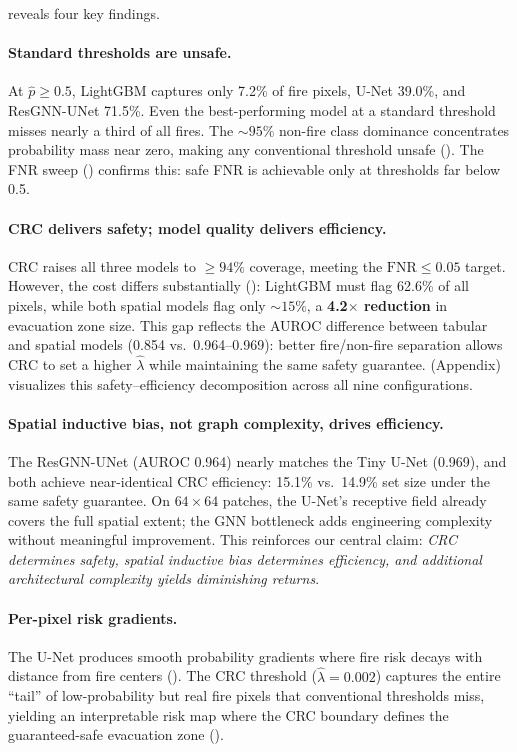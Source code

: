 \documentclass{article}
\begin{document}
 reveals four key findings.

\paragraph{Standard thresholds are unsafe.}
At $\hat{p} \ge 0.5$, LightGBM captures only 7.2\% of fire pixels, U-Net 39.0\%, and ResGNN-UNet 71.5\%.
Even the best-performing model at a standard threshold misses nearly a third of all fires.
The ${\sim}95\%$ non-fire class dominance concentrates probability mass near zero, making any conventional threshold unsafe ().
The FNR sweep () confirms this: safe FNR is achievable only at thresholds far below 0.5.

\paragraph{CRC delivers safety; model quality delivers efficiency.}
CRC raises all three models to ${\ge}94\%$ coverage, meeting the $\mathrm{FNR} \le 0.05$ target.
However, the cost differs substantially ():
LightGBM must flag 62.6\% of all pixels, while both spatial models flag only ${\sim}15\%$, a \textbf{4.2$\times$ reduction} in evacuation zone size.
This gap reflects the AUROC difference between tabular and spatial models (0.854 vs.\ 0.964--0.969): better fire/non-fire separation allows CRC to set a higher $\hat{\lambda}$ while maintaining the same safety guarantee.
 (Appendix) visualizes this safety--efficiency decomposition across all nine configurations.

\paragraph{Spatial inductive bias, not graph complexity, drives efficiency.}
The ResGNN-UNet (AUROC 0.964) nearly matches the Tiny U-Net (0.969), and both achieve near-identical CRC efficiency: 15.1\% vs.\ 14.9\% set size under the same safety guarantee.
On $64{\times}64$ patches, the U-Net's receptive field already covers the full spatial extent; the GNN bottleneck adds engineering complexity without meaningful improvement.
This reinforces our central claim: \emph{CRC determines safety, spatial inductive bias determines efficiency, and additional architectural complexity yields diminishing returns}.

\paragraph{Per-pixel risk gradients.}
The U-Net produces smooth probability gradients where fire risk decays with distance from fire centers ().
The CRC threshold ($\hat{\lambda} = 0.002$) captures the entire ``tail'' of low-probability but real fire pixels that conventional thresholds miss, yielding an interpretable risk map where the CRC boundary defines the guaranteed-safe evacuation zone ().
\end{document}
